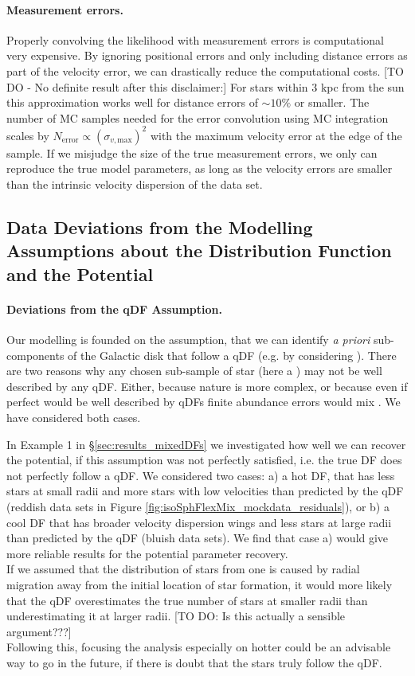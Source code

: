 \paragraph{Measurement errors.} Properly convolving the likelihood with measurement errors is computational very expensive. By ignoring positional errors and only including distance errors as part of the velocity error, we can drastically reduce the computational costs. [TO DO - No definite result after this disclaimer:] For stars within 3 kpc from the sun this approximation works well for distance errors of $\sim 10\%$ or smaller. The number of MC samples needed for the error convolution using MC integration scales by $N_\text{error} \propto (\sigma_{v,\text{max}})^2$ with the maximum velocity error at the edge of the sample. If we misjudge the size of the true measurement errors, we only can reproduce the true model parameters, as long as the velocity errors are smaller than the intrinsic velocity dispersion of the data set.

\subsection{Data Deviations from the Modelling Assumptions about the Distribution Function and the Potential}

\paragraph{Deviations from the qDF Assumption.}  Our modelling is founded on the assumption, that we can identify {\sl a priori} sub-components of the Galactic disk that follow a qDF (e.g. by considering \MAPs ). There are two reasons why any chosen sub-sample of star (here a \MAP ) may not be well described by any qDF. Either, because nature is more complex, or because even if perfect
\MAPs would be well described by qDFs finite abundance errors would mix \MAPs .  We have considered both cases.

 In Example 1 in \S\ref{sec:results_mixedDFs} we investigated how well we can recover the potential, if this assumption was not perfectly satisfied, i.e. the \MAPs true DF does not perfectly follow a qDF. We considered two cases: a) a hot DF, that has less stars at small radii and more stars with low velocities than predicted by the qDF (reddish data sets in Figure \ref{fig:isoSphFlexMix_mockdata_residuals}), or b) a cool DF that has broader velocity dispersion wings and less stars at large radii than predicted by the qDF (bluish data sets). We find that case a) would give more reliable results for the potential parameter recovery.
\\If we assumed that the distribution of stars from one \MAP is caused by radial migration away from the initial location of star formation, it would more likely that the qDF overestimates the true number of stars at smaller radii than underestimating it at larger radii. [TO DO: Is this actually a sensible argument???]
\\Following this, focusing the analysis especially on hotter \MAPs could be an advisable way to go in the future, if there is doubt that the stars truly follow the qDF.


